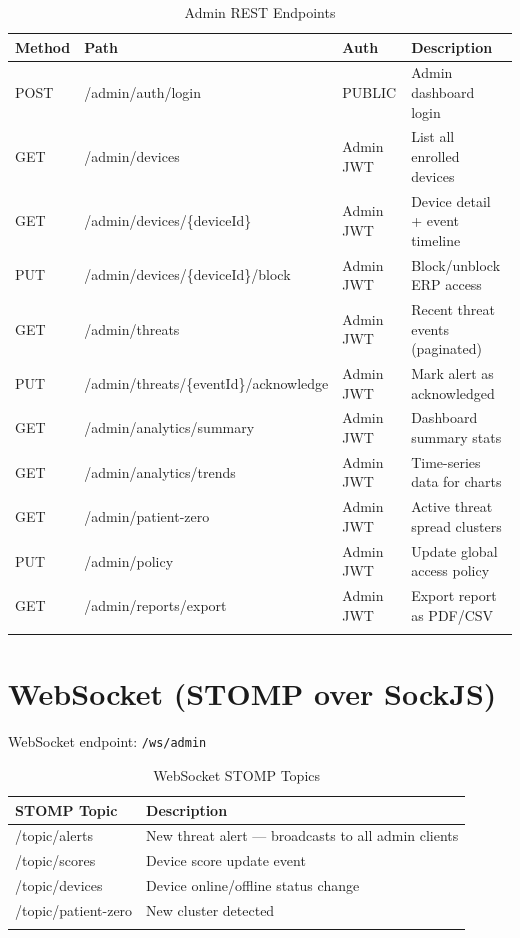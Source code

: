 \documentclass[12pt,a4paper]{report}
\begin{document}
\begin{longtable}{@{}p{1.5cm}p{6cm}p{2cm}p{4cm}@{}}
  \toprule
  \textbf{Method} & \textbf{Path} & \textbf{Auth} & \textbf{Description} \\
  \midrule
  \endhead
  POST & /admin/auth/login                    & PUBLIC     & Admin dashboard login \\
  GET  & /admin/devices                       & Admin JWT  & List all enrolled devices \\
  GET  & /admin/devices/\{deviceId\}          & Admin JWT  & Device detail + event timeline \\
  PUT  & /admin/devices/\{deviceId\}/block    & Admin JWT  & Block/unblock ERP access \\
  GET  & /admin/threats                       & Admin JWT  & Recent threat events (paginated) \\
  PUT  & /admin/threats/\{eventId\}/acknowledge & Admin JWT & Mark alert as acknowledged \\
  GET  & /admin/analytics/summary             & Admin JWT  & Dashboard summary stats \\
  GET  & /admin/analytics/trends              & Admin JWT  & Time-series data for charts \\
  GET  & /admin/patient-zero                  & Admin JWT  & Active threat spread clusters \\
  PUT  & /admin/policy                        & Admin JWT  & Update global access policy \\
  GET  & /admin/reports/export                & Admin JWT  & Export report as PDF/CSV \\
  \bottomrule
  \caption{Admin REST Endpoints}
\end{longtable}

\section{WebSocket (STOMP over SockJS)}

\noindent WebSocket endpoint: \texttt{/ws/admin}

\begin{longtable}{@{}p{5cm}p{9cm}@{}}
  \toprule
  \textbf{STOMP Topic} & \textbf{Description} \\
  \midrule
  \endhead
  /topic/alerts       & New threat alert — broadcasts to all admin clients \\
  /topic/scores       & Device score update event \\
  /topic/devices      & Device online/offline status change \\
  /topic/patient-zero & New cluster detected \\
  \bottomrule
  \caption{WebSocket STOMP Topics}
\end{longtable}
\end{document}
